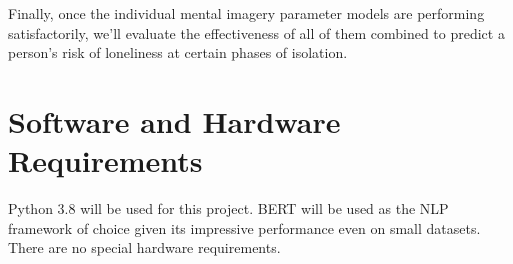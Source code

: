 \documentclass[12pt, a4paper]{article}
\begin{document}
Finally, once the individual mental imagery parameter models are performing satisfactorily, we'll evaluate the effectiveness of all of them combined to predict a person's risk of loneliness at certain phases of isolation.

\section*{Software and Hardware Requirements}

Python 3.8 will be used for this project. BERT \cite{bert} will be used as the NLP framework of choice given its impressive performance even on small datasets. There are no special hardware requirements.



\end{document}
